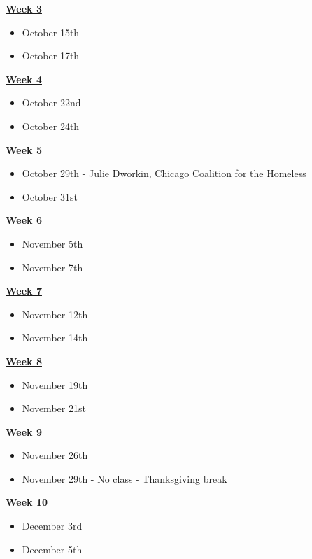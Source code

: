 \documentclass{article}
\begin{document}
\noindent
\textbf{\underline{Week 3}}
\begin{itemize}
\item October 15th
\item October 17th
\end{itemize}
\bigskip

\noindent
\textbf{\underline{Week 4}}
\begin{itemize}
\item October 22nd
\item October 24th
\end{itemize}
\bigskip

\noindent
\textbf{\underline{Week 5}}
\begin{itemize}
\item October 29th - Julie Dworkin, Chicago Coalition for the Homeless
\item October 31st
\end{itemize}
\bigskip

\noindent
\textbf{\underline{Week 6}}
\begin{itemize}
\item November 5th
\item November 7th
\end{itemize}
\bigskip

\noindent
\textbf{\underline{Week 7}}
\begin{itemize}
\item November 12th
\item November 14th
\end{itemize}
\bigskip

\noindent
\textbf{\underline{Week 8}}
\begin{itemize}
\item November 19th
\item November 21st
\end{itemize}
\bigskip

\noindent
\textbf{\underline{Week 9}}
\begin{itemize}
\item November 26th
\item November 29th - No class - Thanksgiving break
\end{itemize}
\bigskip

\noindent
\textbf{\underline{Week 10}}
\begin{itemize}
\item December 3rd
\item December 5th
\end{itemize}
\bigskip
\end{document}
